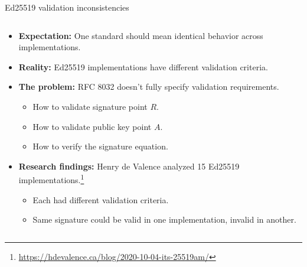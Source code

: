 \documentclass[aspectratio=169, lualatex, handout]{beamer}
\begin{document}
\begin{frame}{Ed25519 validation inconsistencies}
	\begin{columns}[c]
		\begin{column}{1\textwidth}
			\begin{itemize}
				\item \textbf{Expectation:} One standard should mean identical behavior across implementations.
				\item \textbf{Reality:} Ed25519 implementations have different validation criteria.
				\item \textbf{The problem:} RFC 8032 doesn't fully specify validation requirements.
				      \begin{itemize}
					      \item How to validate signature point $R$.
					      \item How to validate public key point $A$.
					      \item How to verify the signature equation.
				      \end{itemize}
				\item \textbf{Research findings:} Henry de Valence analyzed 15 Ed25519 implementations.\footnote{\url{https://hdevalence.ca/blog/2020-10-04-its-25519am/}}
				      \begin{itemize}
					      \item Each had different validation criteria.
					      \item Same signature could be valid in one implementation, invalid in another.
				      \end{itemize}
			\end{itemize}
		\end{column}
	\end{columns}
\end{frame}
\end{document}
